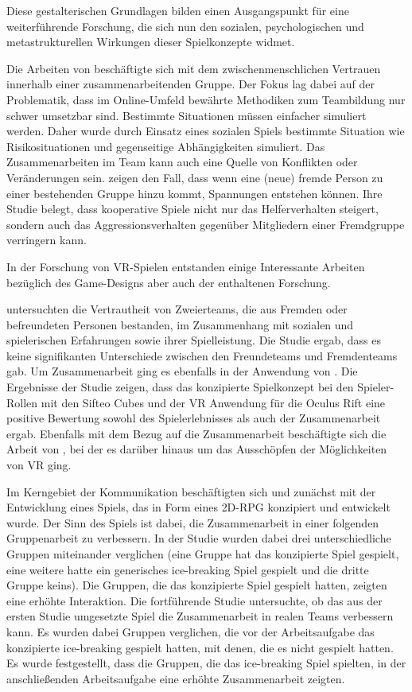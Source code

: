 Diese gestalterischen Grundlagen bilden einen Ausgangspunkt für eine weiterführende Forschung, die sich nun den sozialen, psychologischen und metastrukturellen Wirkungen dieser Spielkonzepte widmet.

Die Arbeiten von \cite{depping_trust_2016} beschäftigte sich mit dem zwischenmenschlichen Vertrauen innerhalb einer zusammenarbeitenden Gruppe. Der Fokus lag dabei auf der Problematik, dass im Online-Umfeld bewährte Methodiken zum Teambildung nur schwer umsetzbar sind. Bestimmte Situationen müssen einfacher simuliert werden. Daher wurde durch Einsatz eines sozialen Spiels bestimmte Situation wie Risikosituationen und gegenseitige Abhängigkeiten simuliert. Das Zusammenarbeiten im Team kann auch eine Quelle von Konflikten oder Veränderungen sein. \cite{velez_ingroup_2014} zeigen den Fall, dass wenn eine (neue) fremde Person zu einer bestehenden Gruppe hinzu kommt, Spannungen entstehen können. Ihre Studie belegt,  dass kooperative Spiele nicht nur das Helferverhalten steigert, sondern auch das Aggressionsverhalten gegenüber Mitgliedern einer Fremdgruppe verringern kann.

In der Forschung von \ac{VR}-Spielen entstanden einige Interessante Arbeiten bezüglich des Game-Designs aber auch der enthaltenen Forschung.

\cite{karaosmanoglu_playing_2023} untersuchten die Vertrautheit von Zweierteams, die aus Fremden oder befreundeten Personen bestanden, im Zusammenhang mit sozialen und spielerischen Erfahrungen sowie ihrer Spielleistung. Die Studie ergab, dass es keine signifikanten Unterschiede zwischen den Freundeteams und Fremdenteams gab. Um Zusammenarbeit ging es ebenfalls in der Anwendung von \cite{sajjadi_maze_2014}. Die Ergebnisse der Studie zeigen, dass das konzipierte Spielkonzept bei den Spieler-Rollen mit den Sifteo Cubes und der VR Anwendung für die Oculus Rift eine positive Bewertung sowohl des Spielerlebnisses als auch der Zusammenarbeit ergab. Ebenfalls mit dem Bezug auf die Zusammenarbeit beschäftigte sich die Arbeit von \cite{smilovitch_birdquestvr_2019}, bei der es darüber hinaus um das Ausschöpfen der Möglichkeiten von \ac{VR} ging.

Im Kerngebiet der Kommunikation beschäftigten sich \cite{nasir_cooperative_2013} und \cite{nasir_effect_2015} zunächst mit der Entwicklung eines  Spiels, das in Form eines \ac{2D}-\ac{RPG} konzipiert und entwickelt wurde. Der Sinn des Spiels ist dabei, die Zusammenarbeit in einer folgenden Gruppenarbeit zu verbessern. In der Studie wurden dabei drei unterschiedliche Gruppen miteinander verglichen (eine Gruppe hat das konzipierte Spiel gespielt, eine weitere hatte ein generisches ice-breaking Spiel gespielt und die dritte Gruppe keins). Die Gruppen, die das konzipierte Spiel gespielt hatten, zeigten eine erhöhte Interaktion. Die fortführende Studie untersuchte, ob das aus der ersten Studie umgesetzte Spiel die Zusammenarbeit in realen Teams verbessern kann. Es wurden dabei Gruppen verglichen, die vor der Arbeitsaufgabe das konzipierte ice-breaking gespielt hatten, mit denen, die es nicht gespielt hatten. Es wurde festgestellt, dass die Gruppen, die das ice-breaking Spiel spielten, in der anschließenden Arbeitsaufgabe eine erhöhte Zusammenarbeit zeigten.

